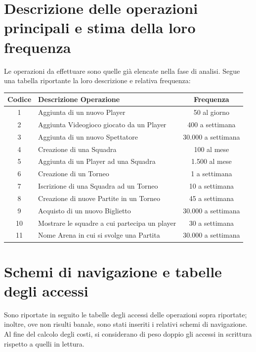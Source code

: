 \documentclass[a4paper,12pt]{report}
\begin{document}
\section{Descrizione delle operazioni principali e stima della loro frequenza}
Le operazioni da effettuare sono quelle già elencate nella fase di analisi. Segue una tabella
riportante la loro descrizione e relativa frequenza:
\begin{center}
	\begin{tabular}{|c|m{8cm}|c|}
		\hline\rowcolor{pink}
		Codice & Descrizione Operazione & Frequenza\\
		\hline\hline
		1 & Aggiunta di un nuovo Player & 50 al giorno\\ 
		\hline	
		2 & Aggiunta Videogioco giocato da un Player & 400 a settimana \\
		\hline
		3 & Aggiunta di un nuovo Spettatore & 30.000 a settimana \\
		\hline
		4 & Creazione di una Squadra & 100 al mese\\
		\hline 
		5 & Aggiunta di un Player ad una Squadra & 1.500 al mese\\ 
		\hline
		6 & Creazione di un Torneo & 1 a settimana\\ 
		\hline
		7 & Iscrizione di una Squadra ad un Torneo & 10 a settimana\\ 
		\hline
		8 & Creazione di nuove Partite in un Torneo & 45 a settimana\\ 
		\hline
		9 & Acquisto di un nuovo Biglietto & 30.000 a settimana\\ 
		\hline
		10 & Mostrare le squadre a cui partecipa un player & 30 a settimana\\
		\hline
		11 & Nome Arena in cui si svolge una Partita & 30.000 a settimana\\
		\hline
	\end{tabular}
\end{center}
\section{Schemi di navigazione e tabelle degli accessi}
Sono riportate in seguito le tabelle degli accessi delle operazioni sopra riportate; inoltre, ove
non risulti banale, sono stati inseriti i relativi schemi di navigazione. Al fine del calcolo degli
costi, si considerano di peso doppio gli accessi in scrittura rispetto a quelli in lettura.
\renewcommand{\arraystretch}{1.15} %
\setlength{\arrayrulewidth}{0.5mm}%
\setlength{\tabcolsep}{10pt}%
\setlength\doublerulesep{0.1cm}%
\end{document}
